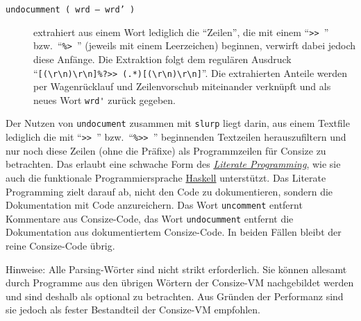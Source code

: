 \begin{description}
\item[\texttt{undocumment ( wrd -- wrd' )}] extrahiert aus einem Wort lediglich die "`Zeilen"', die mit einem "`\verb|>> |"' bzw.\ "`\verb|%> |"'
(jeweils mit einem Leerzeichen) beginnen, verwirft dabei jedoch diese Anfänge. Die Extraktion folgt dem regulären Ausdruck
"`\verb|[(\r\n)\r\n]%?>> (.*)[(\r\n)\r\n]|"'.
Die extrahierten Anteile werden per Wagenrücklauf und Zeilenvorschub miteinander verknüpft und als neues Wort \verb|wrd'| zurück gegeben.
\end{description}

Der Nutzen von \verb|undocument| zusammen mit \verb|slurp| liegt darin, aus einem Textfile lediglich die mit "`\verb|>> |"' bzw.\ "`\verb|%>> |"'
beginnenden Textzeilen herauszufiltern und nur noch diese Zeilen (ohne die Präfixe) als Programmzeilen für Consize zu betrachten. Das erlaubt eine schwache Form des \href{http://de.wikipedia.org/wiki/Literate\_programming}{\emph{Literate Programming}}, wie sie auch die funktionale Programmiersprache \href{http://de.wikipedia.org/wiki/Haskell\_(Programmiersprache)}{Haskell} unterstützt. Das Literate Programming zielt darauf ab, nicht den Code zu dokumentieren, sondern die Dokumentation mit Code anzureichern. Das Wort \verb|uncomment| entfernt Kommentare aus Consize-Code, das Wort \verb|undocumment| entfernt die Dokumentation aus dokumentiertem Consize-Code. In beiden Fällen bleibt der reine Consize-Code übrig.



Hinweise: Alle Parsing-Wörter sind nicht strikt erforderlich. Sie können allesamt durch Programme aus den übrigen Wörtern der Consize-VM nachgebildet werden und sind deshalb als optional zu betrachten. Aus Gründen der Performanz sind sie jedoch als fester Bestandteil der Consize-VM empfohlen. 

